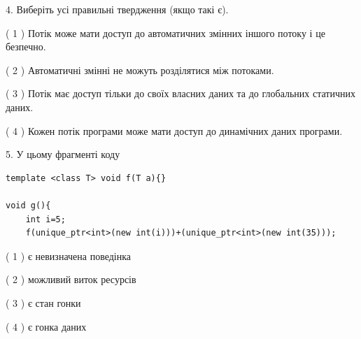 \documentclass[12pt, ukrainian]{article}
\begin{document}
\begin {large}
{%
4. Виберіть усі правильні твердження (якщо такі є).\par
\vspace{2mm}

( 1 ) Потік може мати доступ до автоматичних змінних іншого потоку і це безпечно.%

( 2 ) Автоматичні змінні не можуть розділятися між потоками.%

( 3 ) Потік має доступ тільки до своїх власних даних та до глобальних статичних даних.%

( 4 ) Кожен потік програми може мати доступ до динамічних даних програми.%


5. У цьому фрагменті коду
\begin{verbatim}
template <class T> void f(T a){}

void g(){
    int i=5;
    f(unique_ptr<int>(new int(i)))+(unique_ptr<int>(new int(35)));
\end{verbatim}
( 1 ) є невизначена поведінка%

( 2 ) можливий виток ресурсів%

( 3 ) є стан гонки%

( 4 ) є гонка даних%
}
\end {large}
\end{document}
